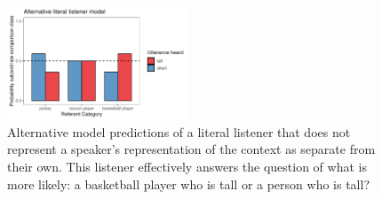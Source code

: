 \documentclass[doc, floatsintext]{apa6}
\begin{document}
\begin{figure}[t]
    \centering
    \includegraphics[width=0.48\textwidth]{figs/cc_inference_L0.pdf}
    \caption{Alternative model predictions of a literal listener that does not represent a speaker's representation of the context as separate from their own. This listener effectively answers the question of what is more likely: a basketball player who is tall or a person who is tall?}
    \label{fig:altModels}
\end{figure}







\end{document}
